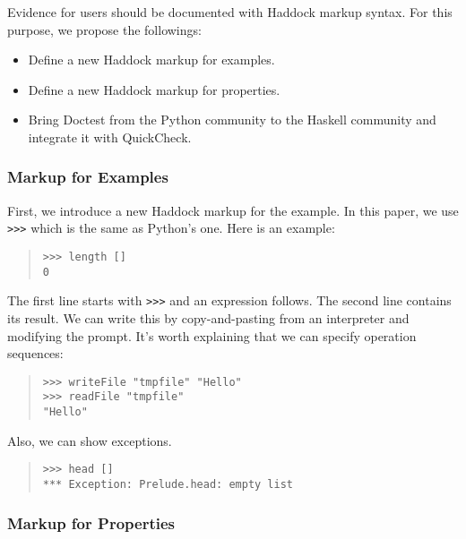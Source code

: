\documentclass[preprint]{sigplanconf}
\begin{document}
Evidence for users should be documented with Haddock markup syntax.
For this purpose, we propose the followings:

\begin{itemize}
\item Define a new Haddock markup for examples.
\item Define a new Haddock markup for properties.
\item Bring Doctest from the Python community to the Haskell
community and integrate it with QuickCheck.
\end{itemize}

\subsubsection{Markup for Examples}

\noindent First, we introduce a new Haddock markup for the example.
In this paper, we use {\tt >>>} which is the same as Python's one.
Here is an example:

\begin{quote}
\small
\begin{verbatim}
>>> length []
0
\end{verbatim}
\end{quote}

\noindent The first line starts with {\tt >>>} and an expression follows. The second line contains its result. We can write this by copy-and-pasting from an interpreter and modifying the prompt.
It's worth explaining that we can specify operation sequences:

\begin{quote}
\small
\begin{verbatim}
>>> writeFile "tmpfile" "Hello"
>>> readFile "tmpfile"
"Hello"
\end{verbatim}
\end{quote}

\noindent Also, we can show exceptions.

\begin{quote}
\small
\begin{verbatim}
>>> head []
*** Exception: Prelude.head: empty list
\end{verbatim}
\end{quote}

\subsubsection{Markup for Properties}
\end{document}
